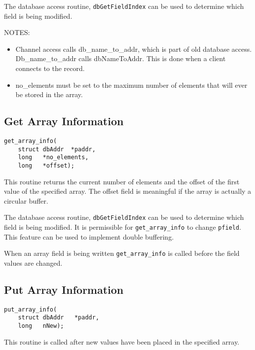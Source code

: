 The database access routine, \verb|dbGetFieldIndex| can be used to determine which field is being modified.

NOTES:

\begin{itemize}
\item Channel access calls db\_name\_to\_addr, which is part of old database access. Db\_name\_to\_addr calls 
dbNameToAddr. This is done when a client connects to the record.

\item no\_elements must be set to the maximum number of elements that will ever be stored in the array.

\end{itemize}

\subsection{Get Array Information}

\begin{verbatim}
get_array_info(
    struct dbAddr  *paddr,
    long   *no_elements,
    long   *offset);
\end{verbatim}

This routine returns the current number of elements and the offset of the first value of the specified array. The offset field 
is meaningful if the array is actually a circular buffer.

The database access routine, \verb|dbGetFieldIndex| can be used to determine which field is being modified. It is 
permissible for \verb|get_array_info| to change \verb|pfield|. This feature can be used to implement double buffering.

When an array field is being written \verb|get_array_info| is called before the field values are changed.

\subsection{Put Array Information}

\begin{verbatim}
put_array_info(
    struct dbAddr   *paddr,
    long   nNew);
\end{verbatim}

This routine is called after new values have been placed in the specified array.

